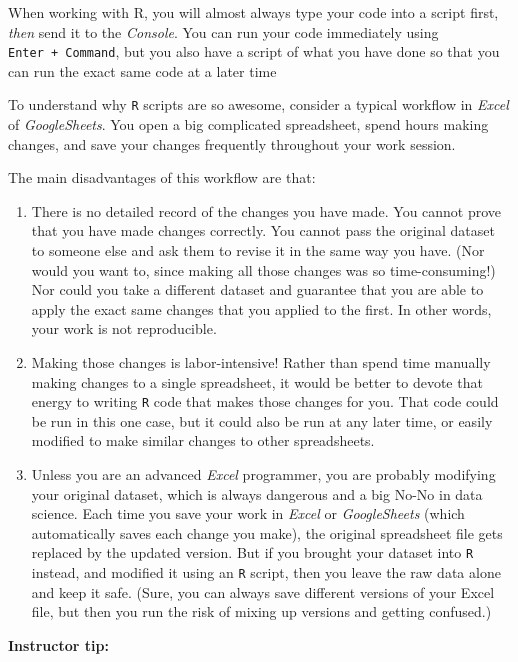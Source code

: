 \documentclass[
]{book}
\begin{document}
When working with R, you will almost always type your code into a script first, \emph{then} send it to the \emph{Console}. You can run your code immediately using \texttt{Enter\ +\ Command}, but you also have a script of what you have done so that you can run the exact same code at a later time

To understand why \texttt{R} scripts are so awesome, consider a typical workflow in \emph{Excel} of \emph{GoogleSheets}. You open a big complicated spreadsheet, spend hours making changes, and save your changes frequently throughout your work session.

The main disadvantages of this workflow are that:

\begin{enumerate}
\def\labelenumi{\arabic{enumi}.}
\item
  There is no detailed record of the changes you have made. You cannot prove that you have made changes correctly. You cannot pass the original dataset to someone else and ask them to revise it in the same way you have. (Nor would you want to, since making all those changes was so time-consuming!) Nor could you take a different dataset and guarantee that you are able to apply the exact same changes that you applied to the first. In other words, your work is not reproducible.
\item
  Making those changes is labor-intensive! Rather than spend time manually making changes to a single spreadsheet, it would be better to devote that energy to writing \texttt{R} code that makes those changes for you. That code could be run in this one case, but it could also be run at any later time, or easily modified to make similar changes to other spreadsheets.
\item
  Unless you are an advanced \emph{Excel} programmer, you are probably modifying your original dataset, which is always dangerous and a big No-No in data science. Each time you save your work in \emph{Excel} or \emph{GoogleSheets} (which automatically saves each change you make), the original spreadsheet file gets replaced by the updated version. But if you brought your dataset into \texttt{R} instead, and modified it using an \texttt{R} script, then you leave the raw data alone and keep it safe. (Sure, you can always save different versions of your Excel file, but then you run the risk of mixing up versions and getting confused.)
\end{enumerate}

\leavevmode\hypertarget{tip-text}{}%
\textbf{Instructor tip:}
\end{document}
